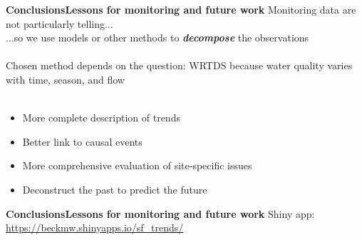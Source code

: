 \documentclass[serif]{beamer}\usepackage[]{graphicx}\usepackage[]{color}
\newcommand{\emtxt}[1]{\textbf{\textit{#1}}}
\begin{document}
\begin{frame}{\textbf{Conclusions}}{\textbf{Lessons for monitoring and future work}}
\onslide<+->
Monitoring data are not particularly telling... \\
...so we use models or other methods to \emtxt{decompose} the observations \\~\\
\onslide<+->
Chosen method depends on the question: WRTDS because water quality varies with time, season, and flow \\~\\
\onslide<+->
\begin{itemize}
\item More complete description of trends
\item Better link to causal events
\item More comprehensive evaluation of site-specific issues
\item Deconstruct the past to predict the future
\end{itemize}
\end{frame}

\begin{frame}{\textbf{Conclusions}}{\textbf{Lessons for monitoring and future work}}
Shiny app: \href{https://beckmw.shinyapps.io/sf_trends/}{\url{https://beckmw.shinyapps.io/sf_trends/}}
\begin{center}
\end{center}
\end{frame}
\end{document}

